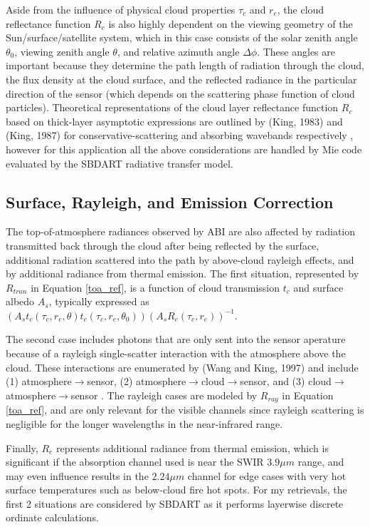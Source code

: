 \documentclass[12pt]{article}
\begin{document}
Aside from the influence of physical cloud properties $\tau_c$ and $r_e$, the cloud reflectance function $R_c$ is also highly dependent on the viewing geometry of the Sun/surface/satellite system, which in this case consists of the solar zenith angle $\theta_0$, viewing zenith angle $\theta$, and relative azimuth angle $\Delta \phi$. These angles are important because they determine the path length of radiation through the cloud, the flux density at the cloud surface, and the reflected radiance in the particular direction of the sensor (which depends on the scattering phase function of cloud particles). Theoretical representations of the cloud layer reflectance function $R_c$ based on thick-layer asymptotic expressions are outlined by (King, 1983) and (King, 1987) for conservative-scattering and absorbing wavebands respectively \cite{king_determination_1987}\cite{king_number_1983}, however for this application all the above considerations are handled by Mie code evaluated by the SBDART radiative transfer model.

\subsection{Surface, Rayleigh, and Emission Correction}

The top-of-atmosphere radiances observed by ABI are also affected by radiation transmitted back through the cloud after being reflected by the surface, additional radiation scattered into the path by above-cloud rayleigh effects, and by additional radiance from thermal emission. The first situation, represented by $R_{tran}$ in Equation \ref{toa_ref}, is a function of cloud transmission $t_c$ and surface albedo $A_s$, typically expressed as $\left(A_s t_c(\tau_c, r_e, \theta) t_c(\tau_c, r_e, \theta_0)\right)\left(A_sR_c(\tau_c, r_e)\right)^{-1}$.

The second case includes photons that are only sent into the sensor aperature because of a rayleigh single-scatter interaction with the atmosphere above the cloud. These interactions are enumerated by (Wang and King, 1997) and include (1) atmosphere$\to$sensor, (2) atmosphere$\to$cloud$\to$sensor, and (3) cloud$\to$atmosphere$\to$sensor \cite{wang_correction_1997}. The rayleigh cases are modeled by $R_{ray}$ in Equation \ref{toa_ref}, and are only relevant for the visible channels since rayleigh scattering is negligible for the longer wavelengths in the near-infrared range.

Finally, $R_e$ represents additional radiance from thermal emission, which is significant if the absorption channel used is near the SWIR $3.9\mu m$ range, and may even influence results in the $2.24\mu m$ channel for edge cases with very hot surface temperatures such as below-cloud fire hot spots. For my retrievals, the first 2 situations are considered by SBDART as it performs layerwise discrete ordinate calculations.
\end{document}
